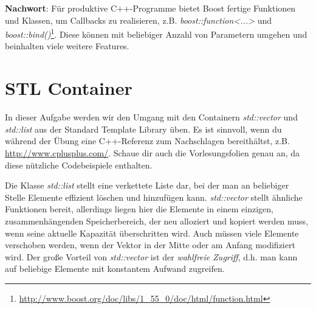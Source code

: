 \textbf{Nachwort}:
Für produktive C++-Programme bietet Boost fertige Funktionen und Klassen, um Callbacks zu realisieren, z.B. \emph{boost::function<...>} und \emph{boost::bind()}\footnote{\url{http://www.boost.org/doc/libs/1_55_0/doc/html/function.html}}. Diese können mit beliebiger Anzahl von Parametern umgehen und beinhalten viele weitere Features.



\section{STL Container} 
In dieser Aufgabe werden wir den Umgang mit den Containern \emph{std::vector} und \emph{std::list} aus der Standard Template Library üben.
Es ist sinnvoll, wenn du während der Übung eine C++-Referenz zum Nachschlagen bereithältst, z.B. \url{http://www.cplusplus.com/}.
Schaue dir auch die Vorlesungsfolien genau an, da diese nützliche Codebeispiele enthalten.

Die Klasse \emph{std::list} stellt eine verkettete Liste dar, bei der man an beliebiger Stelle Elemente effizient löschen und hinzufügen kann. \emph{std::vector} stellt ähnliche Funktionen bereit, allerdings liegen hier die Elemente in einem einzigen, zusammenhängenden Speicherbereich, der neu alloziert und kopiert werden muss, wenn seine aktuelle Kapazität überschritten wird.
Auch müssen viele Elemente verschoben werden, wenn der Vektor in der Mitte oder am Anfang modifiziert wird.
Der große Vorteil von \emph{std::vector} ist der \emph{wahlfreie Zugriff}, d.h. man kann auf beliebige Elemente mit konstantem Aufwand zugreifen.


